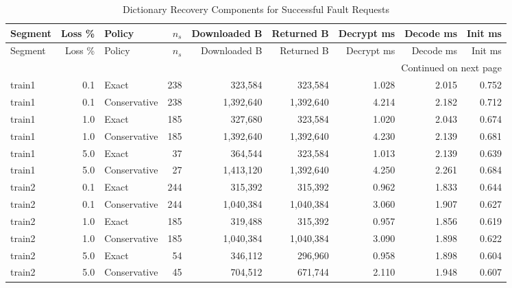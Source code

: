 \begingroup\small\setlength{\tabcolsep}{5pt}
\begin{longtable}{@{}lrlrrrrrr@{}}
\caption{Dictionary Recovery Components for Successful Fault Requests}\label{tab:c3-components}\\
\toprule Segment & Loss \% & Policy & $n_s$ & Downloaded B & Returned B & Decrypt ms & Decode ms & Init ms\\\midrule\endfirsthead
\toprule Segment & Loss \% & Policy & $n_s$ & Downloaded B & Returned B & Decrypt ms & Decode ms & Init ms\\\midrule\endhead
\midrule\multicolumn{9}{r}{Continued on next page}\\\endfoot
\bottomrule\endlastfoot
train1 & 0.1 & Exact & 238 & 323,584 & 323,584 & 1.028 & 2.015 & 0.752\\
train1 & 0.1 & Conservative & 238 & 1,392,640 & 1,392,640 & 4.214 & 2.182 & 0.712\\
train1 & 1.0 & Exact & 185 & 327,680 & 323,584 & 1.020 & 2.043 & 0.674\\
train1 & 1.0 & Conservative & 185 & 1,392,640 & 1,392,640 & 4.230 & 2.139 & 0.681\\
train1 & 5.0 & Exact & 37 & 364,544 & 323,584 & 1.013 & 2.139 & 0.639\\
train1 & 5.0 & Conservative & 27 & 1,413,120 & 1,392,640 & 4.250 & 2.261 & 0.684\\
train2 & 0.1 & Exact & 244 & 315,392 & 315,392 & 0.962 & 1.833 & 0.644\\
train2 & 0.1 & Conservative & 244 & 1,040,384 & 1,040,384 & 3.060 & 1.907 & 0.627\\
train2 & 1.0 & Exact & 185 & 319,488 & 315,392 & 0.957 & 1.856 & 0.619\\
train2 & 1.0 & Conservative & 185 & 1,040,384 & 1,040,384 & 3.090 & 1.898 & 0.622\\
train2 & 5.0 & Exact & 54 & 346,112 & 296,960 & 0.958 & 1.898 & 0.604\\
train2 & 5.0 & Conservative & 45 & 704,512 & 671,744 & 2.110 & 1.948 & 0.607\\
\end{longtable}
\endgroup
